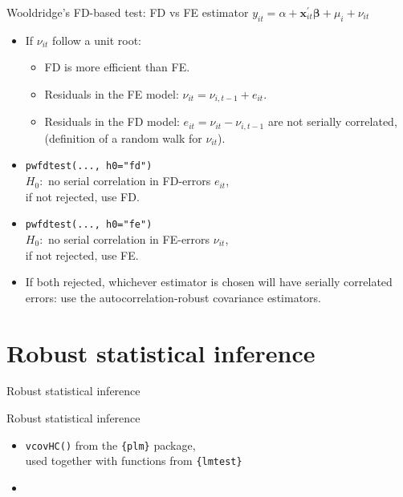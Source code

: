 \documentclass{beamer}
\begin{document}
\begin{frame}{Wooldridge's FD-based test: FD vs FE estimator}
$y_{it} = \alpha + \bm{x}^{\prime}_{it} \bm{\beta} + \mu_i + \nu_{it}$\\ \medskip
\begin{itemize}
    \item If $\nu_{it}$ follow a unit root: 
    \begin{itemize}
          \item FD is more efficient than FE.
          \item Residuals in the FE model: $\nu_{it}=\nu_{i,t-1}+e_{it}$.
          \item Residuals in the FD model: $e_{it} = \nu_{it}-\nu_{i,t-1}$ are not serially correlated, \\(definition of a random walk for $\nu_{it}$).
        \end{itemize}
        \smallskip
        \item \texttt{pwfdtest(..., h0="fd")} \\
        $H_0:$ no serial correlation in FD-errors $e_{it}$, \\if not rejected, use FD.
        \smallskip
        \item \texttt{pwfdtest(..., h0="fe")} \\
        $H_0:$ no serial correlation in FE-errors $\nu_{it}$, \\if not rejected, use FE.
        \smallskip
        \item If both rejected, whichever estimator is chosen will have serially correlated errors: use the autocorrelation-robust covariance estimators.
    \smallskip
\end{itemize}
\end{frame}
\section{Robust statistical inference}
\begin{frame}{Robust statistical inference}
\end{frame}
\begin{frame}{Robust statistical inference}
\begin{itemize}
    \item \texttt{vcovHC()} from the \texttt{\{plm\}} package, 
    \\used together with functions from \texttt{\{lmtest\}}
    \smallskip
    \item 
\end{itemize}
\end{frame}
\end{document}
